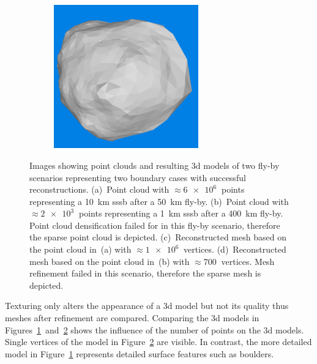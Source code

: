 \begin{figure}[htb]
\begin{subfigure}[b]{0.42\textwidth}
            \caption{} %
            \label{fig:models_50_10}
        \end{subfigure}
        \begin{subfigure}[b]{0.42\textwidth}
            \centering
            \includegraphics[width=\textwidth,height=6.2cm]{doc/thesis/0_figures/models_quality/400_1/120_400_1_mesh2.png}
            \caption{}
            \label{fig:models_400_1}
        \end{subfigure}
    \caption{Images showing point clouds and resulting \gls{3d} models of two fly-by scenarios representing two boundary cases with successful reconstructions. (a)~Point cloud with $\approx\SI{6e6}{}$ points representing a \SI{10}{\kilo\meter} \gls{sssb} after a \SI{50}{\kilo\meter} fly-by. (b)~Point cloud with $\approx\SI{2e3}{}$ points representing a \SI{1}{\kilo\meter} \gls{sssb} after a \SI{400}{\kilo\meter} fly-by. Point cloud densification failed for in this fly-by scenario, therefore the sparse point cloud is depicted. (c)~Reconstructed mesh based on the point cloud in~(a) with $\approx\SI{1e6}{}$ vertices. (d)~Reconstructed mesh based on the point cloud in~(b) with $\approx\SI{700}{}$ vertices. Mesh refinement failed in this scenario, therefore the sparse mesh is depicted.}
    \label{fig:points_models_comp}
\end{figure}

Texturing only alters the appearance of a \gls{3d} model but not its quality thus meshes after refinement are compared. Comparing the \gls{3d} models in Figures~\ref{fig:models_50_10}~and~\ref{fig:models_400_1} shows the influence of the number of points on the \gls{3d} models. Single vertices of the model in Figure~\ref{fig:models_400_1} are visible. In contrast, the more detailed model in Figure~\ref{fig:models_50_10} represents detailed surface features such as boulders.


